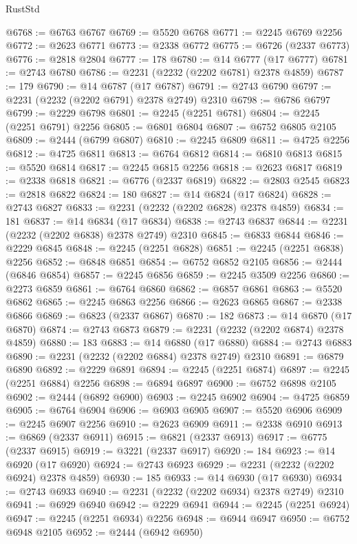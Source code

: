 \begin{lexlean}{RustStd}
\begin{coremodule}
@6768 := @6763 @6767
@6769 := @5520 @6768
@6771 := @2245 @6769 @2256
@6772 := @2623 @6771
@6773 := @2338 @6772
@6775 := @6726 (@2337 @6773)
@6776 := @2818 @2804
@6777 := 178
@6780 := @14 @6777 (@17 @6777)
@6781 := @2743 @6780
@6786 := @2231 (@2232 (@2202 @6781) @2378 @4859)
@6787 := 179
@6790 := @14 @6787 (@17 @6787)
@6791 := @2743 @6790
@6797 := @2231 (@2232 (@2202 @6791) @2378 @2749) @2310
@6798 := @6786 @6797
@6799 := @2229 @6798
@6801 := @2245 (@2251 @6781)
@6804 := @2245 (@2251 @6791) @2256
@6805 := @6801 @6804
@6807 := @6752 @6805 @2105
@6809 := @2444 (@6799 @6807)
@6810 := @2245 @6809
@6811 := @4725 @2256
@6812 := @4725 @6811
@6813 := @6764 @6812
@6814 := @6810 @6813
@6815 := @5520 @6814
@6817 := @2245 @6815 @2256
@6818 := @2623 @6817
@6819 := @2338 @6818
@6821 := @6776 (@2337 @6819)
@6822 := @2803 @2545
@6823 := @2818 @6822
@6824 := 180
@6827 := @14 @6824 (@17 @6824)
@6828 := @2743 @6827
@6833 := @2231 (@2232 (@2202 @6828) @2378 @4859)
@6834 := 181
@6837 := @14 @6834 (@17 @6834)
@6838 := @2743 @6837
@6844 := @2231 (@2232 (@2202 @6838) @2378 @2749) @2310
@6845 := @6833 @6844
@6846 := @2229 @6845
@6848 := @2245 (@2251 @6828)
@6851 := @2245 (@2251 @6838) @2256
@6852 := @6848 @6851
@6854 := @6752 @6852 @2105
@6856 := @2444 (@6846 @6854)
@6857 := @2245 @6856
@6859 := @2245 @3509 @2256
@6860 := @2273 @6859
@6861 := @6764 @6860
@6862 := @6857 @6861
@6863 := @5520 @6862
@6865 := @2245 @6863 @2256
@6866 := @2623 @6865
@6867 := @2338 @6866
@6869 := @6823 (@2337 @6867)
@6870 := 182
@6873 := @14 @6870 (@17 @6870)
@6874 := @2743 @6873
@6879 := @2231 (@2232 (@2202 @6874) @2378 @4859)
@6880 := 183
@6883 := @14 @6880 (@17 @6880)
@6884 := @2743 @6883
@6890 := @2231 (@2232 (@2202 @6884) @2378 @2749) @2310
@6891 := @6879 @6890
@6892 := @2229 @6891
@6894 := @2245 (@2251 @6874)
@6897 := @2245 (@2251 @6884) @2256
@6898 := @6894 @6897
@6900 := @6752 @6898 @2105
@6902 := @2444 (@6892 @6900)
@6903 := @2245 @6902
@6904 := @4725 @6859
@6905 := @6764 @6904
@6906 := @6903 @6905
@6907 := @5520 @6906
@6909 := @2245 @6907 @2256
@6910 := @2623 @6909
@6911 := @2338 @6910
@6913 := @6869 (@2337 @6911)
@6915 := @6821 (@2337 @6913)
@6917 := @6775 (@2337 @6915)
@6919 := @3221 (@2337 @6917)
@6920 := 184
@6923 := @14 @6920 (@17 @6920)
@6924 := @2743 @6923
@6929 := @2231 (@2232 (@2202 @6924) @2378 @4859)
@6930 := 185
@6933 := @14 @6930 (@17 @6930)
@6934 := @2743 @6933
@6940 := @2231 (@2232 (@2202 @6934) @2378 @2749) @2310
@6941 := @6929 @6940
@6942 := @2229 @6941
@6944 := @2245 (@2251 @6924)
@6947 := @2245 (@2251 @6934) @2256
@6948 := @6944 @6947
@6950 := @6752 @6948 @2105
@6952 := @2444 (@6942 @6950)

\end{coremodule}
\end{lexlean}
